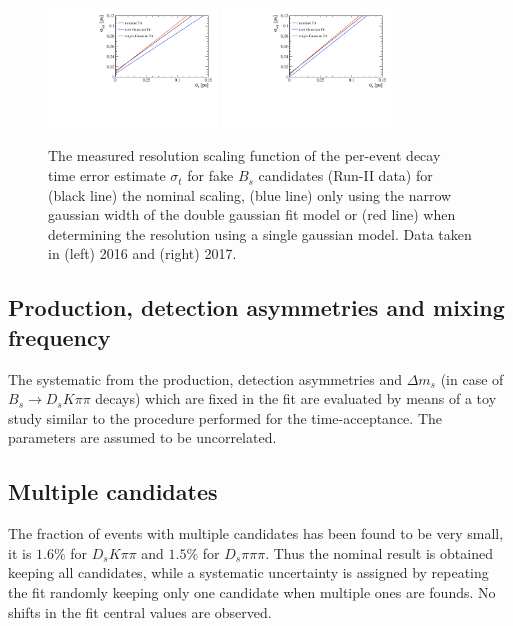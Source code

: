 \begin{figure}[h]
\centering
\includegraphics[height=!,width=0.4\textwidth]{figs/Resolution/ResoSyst_16.pdf}
\includegraphics[height=!,width=0.4\textwidth]{figs/Resolution/ResoSyst_17.pdf}
\caption{\small The measured resolution scaling function of the per-event decay time error estimate $\sigma_t$ for fake $B_s$ candidates (Run-II data) 
for (black line) the nominal scaling, (blue line) only using the narrow gaussian width of the double gaussian fit model or (red line) when determining the resolution using a single gaussian model. 
Data taken in (left) 2016 and (right) 2017.}
\label{fig:SystscaleFactor}
\end{figure}


\subsection{Production, detection asymmetries and mixing frequency}

The systematic from the production, detection asymmetries and $\Delta m_s$ (in case of  $B_s \to D_s K \pi\pi$ decays) which are fixed in the fit
are evaluated by means of a toy study similar to the procedure performed for the time-acceptance.
The parameters are assumed to be uncorrelated.

\subsection{Multiple candidates}

The fraction of events with multiple candidates has been found to be very small, it is $1.6\%$ for $D_s K \pi\pi$ and $1.5\%$ for $D_s \pi \pi\pi$. 
Thus the nominal result is obtained keeping all candidates, while a systematic uncertainty is assigned
by repeating the fit randomly keeping only one candidate when multiple ones are founds.
No shifts in the fit central values are observed.

